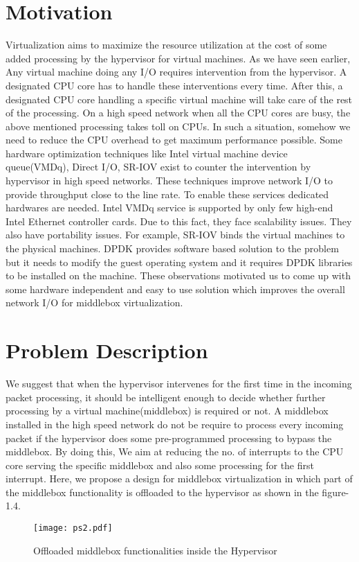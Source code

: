 \documentclass[a4paper,11pt]{report}
\begin{document}
\section{Motivation}
Virtualization aims to maximize the resource utilization at the cost of some added processing by the hypervisor for virtual machines. As we have seen earlier, Any virtual machine doing any I/O requires intervention from the hypervisor. A designated CPU core has to handle these interventions every time. After this, a designated CPU core handling a specific virtual machine will take care of the rest of the processing. On a high speed network when all the CPU cores are busy, the above mentioned processing takes toll on CPUs. In such a situation, somehow we need to reduce the CPU overhead to get maximum performance possible. Some hardware optimization techniques like Intel virtual machine device queue(VMDq)\cite{VMD}, Direct I/O\cite{Santos:2008:BGS:1404014.1404017}, SR-IOV\cite{5416637} exist to counter the intervention by hypervisor in high speed networks. These techniques improve network I/O to provide throughput close to the line rate. To enable these services dedicated hardwares are needed. Intel VMDq service is supported by only few high-end Intel Ethernet controller cards\cite{VMD}. Due to this fact, they face scalability issues. They also have portability issues. For example, SR-IOV binds the virtual machines to the physical machines. DPDK\cite{DPD} provides software based solution to the problem but it needs to modify the guest operating system and it requires DPDK libraries to be installed on the machine. These observations motivated us to come up with some hardware independent and easy to use solution which improves the overall network I/O for middlebox virtualization.                                 
 
\section{Problem Description}        
We suggest that when the hypervisor intervenes for the first time in the incoming packet processing, it should be intelligent enough to decide whether further processing by a virtual machine(middlebox) is required or not. A middlebox installed in the high speed network do not be require to process every incoming packet if the hypervisor does some pre-programmed processing to bypass the middlebox. By doing this, We aim at reducing the no. of interrupts to the CPU core serving the specific middlebox and also some processing for the first interrupt. Here, we propose a design for middlebox virtualization in which part of the middlebox functionality is offloaded to the hypervisor as shown in the figure-1.4.
\begin{figure}[h]
\centering
\texttt{[image: ps2.pdf]}
\caption{Offloaded middlebox functionalities inside the Hypervisor}
\end{figure}
  
\end{document}
